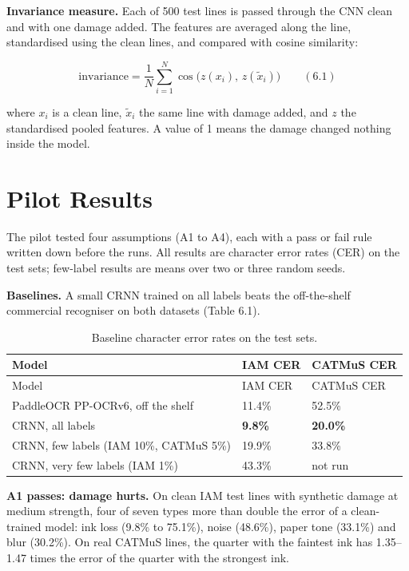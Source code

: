 \documentclass[
  12pt,
  a4paper,
]{report}
\begin{document}
\textbf{Invariance measure.} Each of 500 test lines is passed through
the CNN clean and with one damage added. The features are averaged along
the line, standardised using the clean lines, and compared with cosine
similarity:

\[\text{invariance} = \frac{1}{N}\sum_{i=1}^{N} \cos\big(z(x_i),\, z(\tilde{x}_i)\big) \qquad (6.1)\]

where \(x_i\) is a clean line, \(\tilde{x}_i\) the same line with damage
added, and \(z\) the standardised pooled features. A value of 1 means
the damage changed nothing inside the model.

\section{Pilot Results}\label{pilot-results}

The pilot tested four assumptions (A1 to A4), each with a pass or fail
rule written down before the runs. All results are character error rates
(CER) on the test sets; few-label results are means over two or three
random seeds.

\textbf{Baselines.} A small CRNN trained on all labels beats the
off-the-shelf commercial recogniser on both datasets (Table 6.1).

\begin{longtable}[]{@{}lll@{}}
\caption{Baseline character error rates on the test
sets.}\tabularnewline
\toprule\noalign{}
Model & IAM CER & CATMuS CER \\
\midrule\noalign{}
\endfirsthead
\toprule\noalign{}
Model & IAM CER & CATMuS CER \\
\midrule\noalign{}
\endhead
\bottomrule\noalign{}
\endlastfoot
PaddleOCR PP-OCRv6, off the shelf & 11.4\% & 52.5\% \\
CRNN, all labels & \textbf{9.8\%} & \textbf{20.0\%} \\
CRNN, few labels (IAM 10\%, CATMuS 5\%) & 19.9\% & 33.8\% \\
CRNN, very few labels (IAM 1\%) & 43.3\% & not run \\
\end{longtable}

\textbf{A1 passes: damage hurts.} On clean IAM test lines with synthetic
damage at medium strength, four of seven types more than double the
error of a clean-trained model: ink loss (9.8\% to 75.1\%), noise
(48.6\%), paper tone (33.1\%) and blur (30.2\%). On real CATMuS lines,
the quarter with the faintest ink has 1.35--1.47 times the error of the
quarter with the strongest ink.
\end{document}
